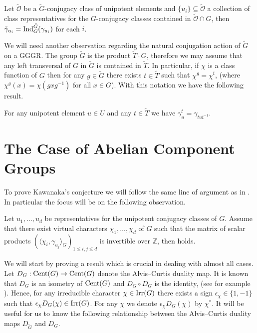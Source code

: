 \documentclass{jt-calcs}
\renewcommand{\cref}{\Cref}
\begin{document}
\begin{lem}\label{lem:induction-of-GGGRs}
Let $\mathcal{\tilde{O}}$ be a $\tilde{G}$-conjugacy class of unipotent elements and $\{u_i\} \subseteq \mathcal{\tilde{O}}$ a collection of class representatives for the $G$-conjugacy classes contained in $\mathcal{\tilde{O}} \cap G$, then $\tilde{\gamma}_{u_i} = \operatorname{Ind}_{G}^{\tilde{G}}(\gamma_{u_i})$ for each $i$.
\end{lem}

We will need another observation regarding the natural conjugation action of $\tilde{G}$ on a GGGR. The group $\tilde{G}$ is the product $\tilde{T}\cdot G$, therefore we may assume that any left transversal of $G$ in $\tilde{G}$ is contained in $\tilde{T}$. In particular, if $\chi$ is a class function of $G$ then for any $g \in \tilde{G}$ there exists $t \in \tilde{T}$ such that $\chi^g = \chi^t$, (where $\chi^g(x) = \chi(gxg^{-1})$ for all $x \in G$). With this notation we have the following result.

\begin{prop}\label{prop:gggr-conj}
For any unipotent element $u \in U$ and any $t \in \tilde{T}$ we have $\gamma_u^t = \gamma_{tut^{-1}}$.
\end{prop}

\section{The Case of Abelian Component Groups}\label{sec:ab-comp-groups}
To prove Kawanaka's conjecture we will follow the same line of argument as in \cite[\S 4]{geck-hezard:2008:unipotent-support}. In particular the focus will be on the following observation.

\begin{lem}\label{lem:matrix-mult-invert}
Let $u_1,\dots,u_d$ be representatives for the unipotent conjugacy classes of $G$. Assume that there exist virtual characters $\chi_1,\dots,\chi_d$ of $G$ such that the matrix of scalar products $(\langle \chi_i,\gamma_{u_j} \rangle_{G})_{1 \leqslant i,j \leqslant d}$ is invertible over $\mathbb{Z}$, then \cref{conj:kawanaka} holds.
\end{lem}

\noindent We will start by proving a result which is crucial in dealing with almost all cases. Let $D_G : \operatorname{Cent}(G) \to \operatorname{Cent}(G)$ denote the Alvis--Curtis duality map. It is known that $D_G$ is an isometry of $\operatorname{Cent}(G)$ and $D_G \circ D_G$ is the identity, (see for example \cite[\S 8]{digne-michel:1991:representations-of-finite-groups-of-lie-type}). Hence, for any irreducible character $\chi \in \operatorname{Irr}(G)$ there exists a sign $\epsilon_{\chi} \in \{1,-1\}$ such that $\epsilon_{\chi}D_G(\chi) \in \operatorname{Irr}(G)$. For any $\chi$ we denote $\epsilon_{\chi}D_G(\chi)$ by $\chi^*$. It will be useful for us to know the following relationship between the Alvis--Curtis duality maps $D_{\tilde{G}}$ and $D_G$.
\end{document}
